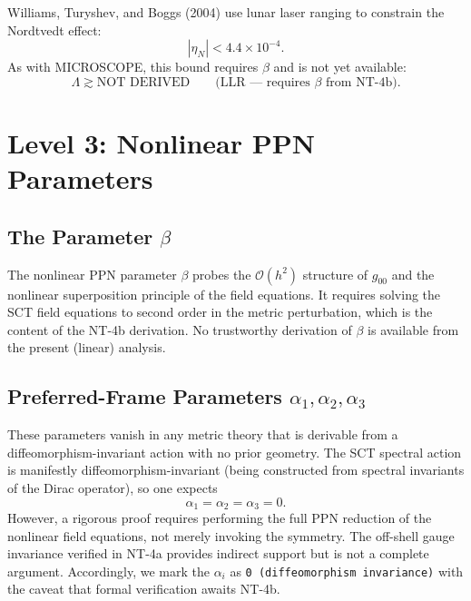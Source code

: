\documentclass[11pt,a4paper]{article}
\newcommand{\order}{\mathcal{O}}
\begin{document}
Williams, Turyshev, and Boggs (2004) use lunar laser ranging to constrain
the Nordtvedt effect:
\begin{equation}
  |\eta_N| < 4.4 \times 10^{-4}.
\end{equation}
As with MICROSCOPE, this bound requires $\beta$ and is not yet available:
\begin{equation}
  \Lambda \gtrsim \text{NOT DERIVED}
  \qquad \text{(LLR --- requires $\beta$ from NT-4b).}
\end{equation}


\section{Level 3: Nonlinear PPN Parameters}
\label{sec:level3}

\subsection{The Parameter \texorpdfstring{$\beta$}{beta}}

The nonlinear PPN parameter $\beta$ probes the $\order(h^2)$ structure of
$g_{00}$ and the nonlinear superposition principle of the field equations.
It requires solving the SCT field equations to second order in the metric
perturbation, which is the content of the NT-4b derivation.  No trustworthy
derivation of $\beta$ is available from the present (linear) analysis.

\subsection{Preferred-Frame Parameters
  \texorpdfstring{$\alpha_1, \alpha_2, \alpha_3$}{alpha\_1, alpha\_2, alpha\_3}}

These parameters vanish in any metric theory that is derivable from a
diffeomorphism-invariant action with no prior geometry.  The SCT spectral
action is manifestly diffeomorphism-invariant (being constructed from
spectral invariants of the Dirac operator), so one expects
\begin{equation}
  \alpha_1 = \alpha_2 = \alpha_3 = 0.
\end{equation}
However, a rigorous proof requires performing the full PPN reduction of the
nonlinear field equations, not merely invoking the symmetry.  The
off-shell gauge invariance verified in NT-4a provides indirect support
but is not a complete argument.  Accordingly, we mark the $\alpha_i$ as
\texttt{0 (diffeomorphism invariance)} with the caveat that formal
verification awaits NT-4b.
\end{document}
